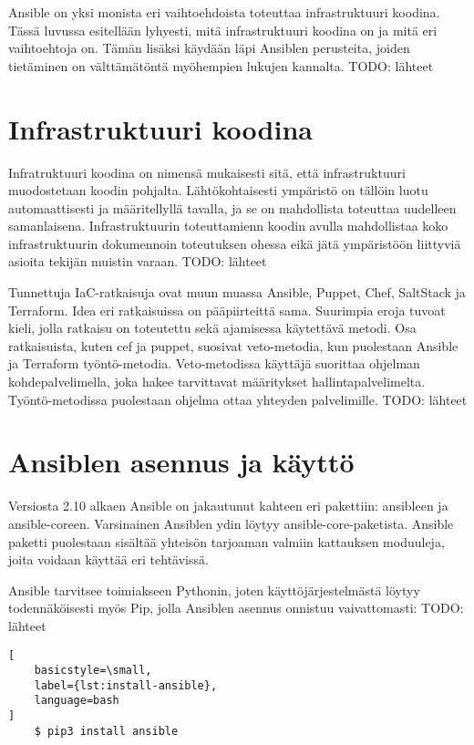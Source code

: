 Ansible on yksi monista eri vaihtoehdoista toteuttaa infrastruktuuri koodina.
Tässä luvussa esitellään lyhyesti, mitä infrastruktuuri koodina on ja
mitä eri vaihtoehtoja on. Tämän lisäksi käydään läpi Ansiblen perusteita,
joiden tietäminen on välttämätöntä myöhempien lukujen kannalta.
TODO: lähteet

\section{Infrastruktuuri koodina}

Infratruktuuri koodina on nimensä mukaisesti sitä, että infrastruktuuri
muodostetaan koodin pohjalta. Lähtökohtaisesti ympäristö on tällöin
luotu automaattisesti ja määritellyllä tavalla, ja se on mahdollista
toteuttaa uudelleen samanlaisena. Infrastruktuurin toteuttamienn koodin
avulla mahdollistaa koko infrastruktuurin dokumennoin toteutuksen ohessa
eikä jätä ympäristöön liittyviä asioita tekijän muistin varaan.
TODO: lähteet

Tunnettuja IaC-ratkaisuja ovat muun muassa Ansible, Puppet, Chef, SaltStack
ja Terraform. Idea eri ratkaisuissa on pääpiirteittä sama. Suurimpia eroja
tuvoat kieli, jolla ratkaisu on toteutettu sekä ajamisessa käytettävä
metodi. Osa ratkaisuista, kuten cef ja puppet, suosivat veto-metodia,
kun puolestaan Ansible ja Terraform työntö-metodia. Veto-metodissa
käyttäjä suorittaa ohjelman kohdepalvelimella, joka hakee tarvittavat
määritykset hallintapalvelimelta. Työntö-metodissa puolestaan ohjelma
ottaa yhteyden palvelimille.
TODO: lähteet

\section{Ansiblen asennus ja käyttö}

Versiosta 2.10 alkaen Ansible on jakautunut kahteen eri pakettiin:
ansibleen ja ansible-coreen. Varsinainen Ansiblen ydin löytyy
ansible-core-paketista. Ansible paketti puolestaan sisältää yhteisön
tarjoaman valmiin kattauksen moduuleja, joita voidaan käyttää eri
tehtävissä. \parencite{AnsibleDocs}

Ansible tarvitsee toimiakseen Pythonin, joten käyttöjärjestelmästä
löytyy todennäköisesti myös Pip, jolla Ansiblen asennus onnistuu
vaivattomasti:
TODO: lähteet

\begin{lstlisting}[
    basicstyle=\small,
    label={lst:install-ansible},
    language=bash
]
    $ pip3 install ansible
\end{lstlisting}

